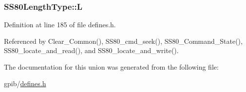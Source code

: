 \subsubsection[{\texorpdfstring{L}{L}}]{ S\+S80\+Length\+Type\+::L}\hypertarget{unionSS80LengthType_a8939afbd3197ba892aa2b15782086a71}{}\label{unionSS80LengthType_a8939afbd3197ba892aa2b15782086a71}


Definition at line 185 of file defines.\+h.



Referenced by Clear\+\_\+\+Common(), S\+S80\+\_\+cmd\+\_\+seek(), S\+S80\+\_\+\+Command\+\_\+\+State(), S\+S80\+\_\+locate\+\_\+and\+\_\+read(), and S\+S80\+\_\+locate\+\_\+and\+\_\+write().



The documentation for this union was generated from the following file\+:\begin{DoxyCompactItemize}
\item 
gpib/\hyperlink{defines_8h}{defines.\+h}\end{DoxyCompactItemize}
